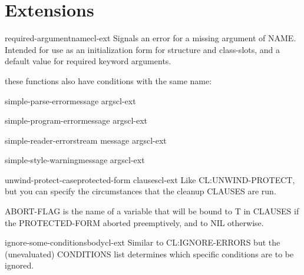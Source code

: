 \section{Extensions}
\label{sec:extensions}

\begin{function}{required-argument}{\op name}{cl-ext}{}
  Signals an error for a missing argument of NAME. Intended for
use as an initialization form for structure and class-slots, and
a default value for required keyword arguments.
\end{function}

these functions also have conditions with the same name:

\begin{function}{simple-parse-error}{message \rest args}{cl-ext}{}
  
\end{function}

\begin{function}{simple-program-error}{message \rest args}{cl-ext}{}
  
\end{function}

\begin{function}{simple-reader-error}{stream message \rest args}{cl-ext}{}
  
\end{function}

\begin{function}{simple-style-warning}{message \rest args}{cl-ext}{}
  
\end{function}

\begin{macro}{unwind-protect-case}{\op protected-form \body clauses}{cl-ext}{}
  Like CL:UNWIND-PROTECT, but you can specify the circumstances that
the cleanup CLAUSES are run.

ABORT-FLAG is the name of a variable that will be bound to T in
CLAUSES if the PROTECTED-FORM aborted preemptively, and to NIL
otherwise.
\end{macro}

\begin{macro}{ignore-some-conditions}{\rest \body body}{cl-ext}{}
  Similar to CL:IGNORE-ERRORS but the (unevaluated) CONDITIONS
list determines which specific conditions are to be ignored.
\end{macro}
